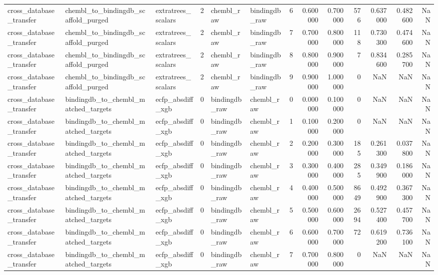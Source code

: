 \begin{longtable}{lllrllrrrrrrr}
cross\_database\_transfer & chembl\_to\_bindingdb\_scaffold\_purged & extratrees\_scalars & 2 & chembl\_raw & bindingdb\_raw & 6 & 0.600000 & 0.700000 & 576 & 0.637000 & 0.482600 & NaN \\
cross\_database\_transfer & chembl\_to\_bindingdb\_scaffold\_purged & extratrees\_scalars & 2 & chembl\_raw & bindingdb\_raw & 7 & 0.700000 & 0.800000 & 118 & 0.730300 & 0.474600 & NaN \\
cross\_database\_transfer & chembl\_to\_bindingdb\_scaffold\_purged & extratrees\_scalars & 2 & chembl\_raw & bindingdb\_raw & 8 & 0.800000 & 0.900000 & 7 & 0.834600 & 0.285700 & NaN \\
cross\_database\_transfer & chembl\_to\_bindingdb\_scaffold\_purged & extratrees\_scalars & 2 & chembl\_raw & bindingdb\_raw & 9 & 0.900000 & 1.000000 & 0 & NaN & NaN & NaN \\
cross\_database\_transfer & bindingdb\_to\_chembl\_matched\_targets & ecfp\_absdiff\_xgb & 0 & bindingdb\_raw & chembl\_raw & 0 & 0.000000 & 0.100000 & 0 & NaN & NaN & NaN \\
cross\_database\_transfer & bindingdb\_to\_chembl\_matched\_targets & ecfp\_absdiff\_xgb & 0 & bindingdb\_raw & chembl\_raw & 1 & 0.100000 & 0.200000 & 0 & NaN & NaN & NaN \\
cross\_database\_transfer & bindingdb\_to\_chembl\_matched\_targets & ecfp\_absdiff\_xgb & 0 & bindingdb\_raw & chembl\_raw & 2 & 0.200000 & 0.300000 & 185 & 0.261300 & 0.037800 & NaN \\
cross\_database\_transfer & bindingdb\_to\_chembl\_matched\_targets & ecfp\_absdiff\_xgb & 0 & bindingdb\_raw & chembl\_raw & 3 & 0.300000 & 0.400000 & 285 & 0.349900 & 0.186000 & NaN \\
cross\_database\_transfer & bindingdb\_to\_chembl\_matched\_targets & ecfp\_absdiff\_xgb & 0 & bindingdb\_raw & chembl\_raw & 4 & 0.400000 & 0.500000 & 8649 & 0.492900 & 0.367300 & NaN \\
cross\_database\_transfer & bindingdb\_to\_chembl\_matched\_targets & ecfp\_absdiff\_xgb & 0 & bindingdb\_raw & chembl\_raw & 5 & 0.500000 & 0.600000 & 2694 & 0.527400 & 0.457700 & NaN \\
cross\_database\_transfer & bindingdb\_to\_chembl\_matched\_targets & ecfp\_absdiff\_xgb & 0 & bindingdb\_raw & chembl\_raw & 6 & 0.600000 & 0.700000 & 72 & 0.619200 & 0.736100 & NaN \\
cross\_database\_transfer & bindingdb\_to\_chembl\_matched\_targets & ecfp\_absdiff\_xgb & 0 & bindingdb\_raw & chembl\_raw & 7 & 0.700000 & 0.800000 & 0 & NaN & NaN & NaN \\

\end{longtable}
